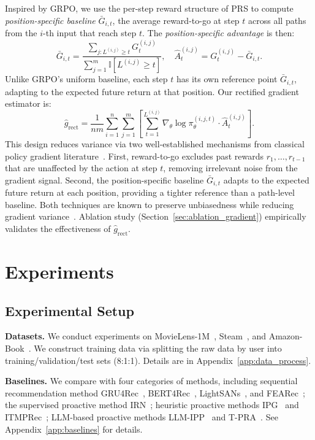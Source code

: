 \documentclass{llmxive}
\begin{document}
Inspired by GRPO, we use the per-step reward structure of PRS to compute \emph{position-specific baseline} $\bar{G}_{i,t}$, the average reward-to-go at step $t$ across all paths from the $i$-th input that reach step $t$. The \emph{position-specific advantage} is then:
\begin{equation}
\bar{G}_{i,t} = \frac{\sum_{j: L^{(i,j)} \geq t} G_t^{(i,j)}}{\sum_{j=1}^{m} \mathbb{I}[L^{(i,j)} \geq t]}, \quad \hat{A}_t^{(i,j)} = G_t^{(i,j)} - \bar{G}_{i,t}.
\label{eq:step-advantage}
\end{equation}
Unlike GRPO's uniform baseline, each step $t$ has its own reference point $\bar{G}_{i,t}$, adapting to the expected future return at that position. Our rectified gradient estimator is:
\begin{equation}
\hat{g}_{\mathrm{rect}} = \frac{1}{nm}\sum_{i=1}^{n}\sum_{j=1}^{m}\left[\sum_{t=1}^{L^{(i,j)}} \nabla_\theta \log \pi_\theta^{(i,j,t)} \cdot \hat{A}_t^{(i,j)}\right].
\label{eq:g-rect}
\end{equation}
This design reduces variance via two well-established mechanisms from 
classical policy gradient literature~\citep{Williams92simple,sutton1999policy}. 
First, reward-to-go excludes past rewards $r_1, \ldots, r_{t-1}$ that are unaffected by the action at step $t$, removing irrelevant noise from the gradient signal. Second, the position-specific baseline $\bar{G}_{i,t}$ adapts to the expected future return at each position, providing a tighter reference than a path-level baseline. Both techniques are known to preserve unbiasedness while reducing gradient variance~\citep{GreensmithBB01}. Ablation study (Section~\ref{sec:ablation_gradient}) 
empirically validates the effectiveness of $\hat{g}_{\mathrm{rect}}$.
\section{Experiments}
\label{sec:exp}

\subsection{Experimental Setup}

\textbf{Datasets.} We conduct experiments on MovieLens-1M~\cite{harper2015movielens}, Steam~\cite{kang2018self}, and Amazon-Book~\cite{ni2019justifying}. We construct training data via splitting the raw data by user into training/validation/test sets (8:1:1). Details are in Appendix~\ref{app:data_process}.

\textbf{Baselines.} We compare with four categories of methods, including sequential recommendation method GRU4Rec~\cite{hidasi2015session}, BERT4Rec~\cite{sun2019bert4rec}, LightSANs~\cite{fan2021lighter}, and FEARec~\cite{du2023frequency}; the supervised proactive method IRN~\cite{zhu2023influential}; heuristic proactive methods IPG~\cite{bi2024proactive} and ITMPRec~\cite{lian2025itmprec}; LLM-based proactive methods LLM-IPP~\cite{wang2025leveraging} and T-PRA~\cite{wang2025tunable}. See Appendix~\ref{app:baselines} for details.
\end{document}
